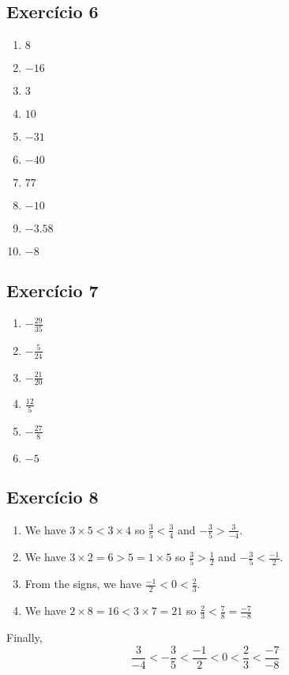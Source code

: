 \subsection*{Exercício 6}

\begin{enumerate}
\item $8$
\item $-16$
\item $3$
\item $10$
\item $-31$
\item $-40$
\item $77$
\item $-10$
\item $-3.58$
\item $-8$
\end{enumerate}

\subsection*{Exercício 7}

\begin{enumerate}
\item $-\frac{29}{35}$
\item $-\frac{5}{24}$
\item $-\frac{21}{20}$
\item $\frac{12}{5}$
\item $-\frac{27}{8}$
\item $-5$
\end{enumerate}

\subsection*{Exercício 8}

\begin{enumerate}

\item We have $3 \times 5 < 3 \times 4$ so $\frac{3}{5} < \frac{3}{4}$ and
$-\frac{3}{5} > \frac{3}{-4}$.

\item We have $3 \times 2 = 6 > 5 = 1 \times 5$ so
  $\frac{3}{5} > \frac{1}{2}$ and
  $-\frac{3}{5} < \frac{-1}{2}$.

\item From the signs, we have $\frac{-1}{2} < 0 < \frac{2}{3}$.

\item We have $2 \times 8 = 16 < 3 \times 7 = 21$ so
  $\frac{2}{3} < \frac{7}{8} = \frac{-7}{-8}$

\end{enumerate}

Finally, $$\frac{3}{-4} < -\frac{3}{5} < \frac{-1}{2} < 0 < \frac{2}{3} < \frac{-7}{-8}$$
